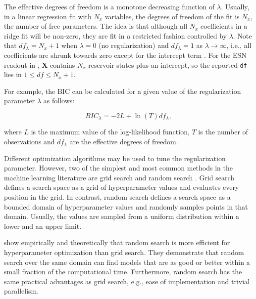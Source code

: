 The effective degrees of freedom is a monotone decreasing function of \(\lambda\). Usually, in a linear regression fit with \(N_x\) variables, the degrees of freedom of the fit is \(N_x\), the number of free parameters. The idea is that although all \(N_x\) coefficients in a ridge fit will be non-zero, they are fit in a restricted fashion controlled by \(\lambda\). Note that \(df_\lambda = N_x + 1\) when \(\lambda = 0\) (no regularization) and \(df_{\lambda} = 1\) as \(\lambda \rightarrow \infty\), i.e., all coefficients are shrunk towards zero except for the intercept term \citep{Hastie2009}. For the ESN readout in , \(\mathbf{X}\) contains \(N_x\) reservoir states plus an intercept, so the reported \texttt{df} lies in \(1 \le df \le N_x+1\).

For example, the BIC can be calculated for a given value of the regularization parameter \(\lambda\) as follows:

\begin{equation}
BIC_{\lambda} = -2 L + \ln(T) df_{\lambda},
\label{eq:bic}
\end{equation}

where \(L\) is the maximum value of the log-likelihood function, \(T\) is the number of observations and \(df_{\lambda}\) are the effective degrees of freedom.

Different optimization algorithms may be used to tune the regularization parameter. However, two of the simplest and most common methods in the machine learning literature are grid search and random search \citep{Bergstra2012}. Grid search defines a search space as a grid of hyperparameter values and evaluates every position in the grid. In contrast, random search defines a search space as a bounded domain of hyperparameter values and randomly samples points in that domain. Usually, the values are sampled from a uniform distribution within a lower and an upper limit.

\citet{Bergstra2012} show empirically and theoretically that random search is more efficient for hyperparameter optimization than grid search. They demonstrate that random search over the same domain can find models that are as good or better within a small fraction of the computational time. Furthermore, random search has the same practical advantages as grid search, e.g., ease of implementation and trivial parallelism.


